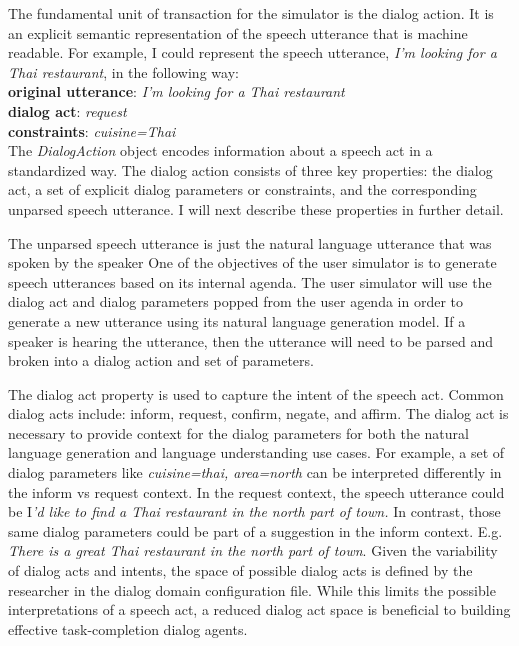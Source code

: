 The fundamental unit of transaction for the simulator is the dialog action. It is an explicit semantic representation of the speech utterance that is machine readable. For example, I could represent the speech utterance, \textit{I'm looking for a Thai restaurant}, in the following way: \\
\textbf{original utterance}: \textit{I'm looking for a Thai restaurant}   \\
\textbf{dialog act}: \textit{request}\\ 
\textbf{constraints}: \textit{cuisine=Thai}\\

The \textit{DialogAction} object encodes information about a speech act in a standardized way. The dialog action consists of three key properties: the dialog act, a set of explicit dialog parameters or constraints, and the corresponding unparsed speech utterance. I will next describe these properties in further detail. 

The unparsed speech utterance is just the natural language utterance that was spoken by the speaker One of the objectives of the user simulator is to generate speech utterances based on its internal agenda. The user simulator will use the dialog act and dialog parameters popped from the user agenda in order to generate a new utterance using its natural language generation model. If a speaker is hearing the utterance, then the utterance will need to be parsed and broken into a dialog action and set of parameters. 

The dialog act property is used to capture the intent of the speech act. Common dialog acts include: inform, request, confirm, negate, and affirm. The dialog act is necessary to provide context for the dialog parameters for both the natural language generation and language understanding use cases. For example, a set of dialog parameters like \textit{{cuisine=thai, area=north}} can be interpreted differently in the inform vs request context. In the request context, the speech utterance could be I\textit{'d like to find a Thai restaurant in the north part of town.} In contrast, those same dialog parameters could be part of a suggestion in the inform context. E.g. \textit{There is a great Thai restaurant in the north part of town}. Given the variability of dialog acts and intents, the space of possible dialog acts is defined by the researcher in the dialog domain configuration file. While this limits the possible interpretations of a speech act, a reduced dialog act space is beneficial to building effective task-completion dialog agents.  

